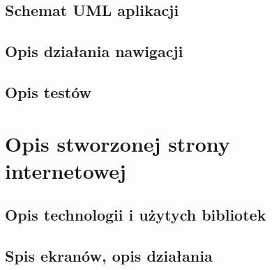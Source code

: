 \subsection{Schemat UML aplikacji}



\subsection{Opis działania nawigacji}



\subsection{Opis testów}



\section{Opis stworzonej strony internetowej}



\subsection{Opis technologii i użytych bibliotek}



\subsection{Spis ekranów, opis działania}


